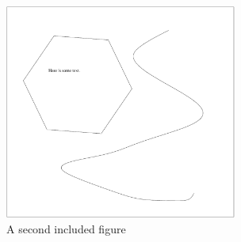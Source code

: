 \documentclass{article}
\begin{document}
\begin{figure}
  \begin{center}
     \includegraphics[width=3.0in]{something.pdf}
  \end{center}

  \caption{A second included figure}
  \label{fig:something}
\end{figure}
\end{document}
